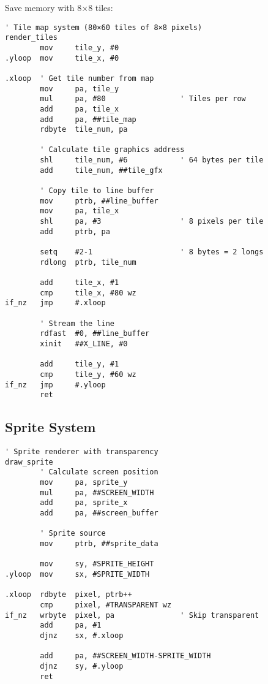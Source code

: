\documentclass[11pt]{book}
\begin{document}
Save memory with 8×8 tiles:

\begin{lstlisting}
' Tile map system (80×60 tiles of 8×8 pixels)
render_tiles
        mov     tile_y, #0
.yloop  mov     tile_x, #0
        
.xloop  ' Get tile number from map
        mov     pa, tile_y
        mul     pa, #80                 ' Tiles per row
        add     pa, tile_x
        add     pa, ##tile_map
        rdbyte  tile_num, pa
        
        ' Calculate tile graphics address
        shl     tile_num, #6            ' 64 bytes per tile
        add     tile_num, ##tile_gfx
        
        ' Copy tile to line buffer
        mov     ptrb, ##line_buffer
        mov     pa, tile_x
        shl     pa, #3                  ' 8 pixels per tile
        add     ptrb, pa
        
        setq    #2-1                    ' 8 bytes = 2 longs
        rdlong  ptrb, tile_num
        
        add     tile_x, #1
        cmp     tile_x, #80 wz
if_nz   jmp     #.xloop
        
        ' Stream the line
        rdfast  #0, ##line_buffer
        xinit   ##X_LINE, #0
        
        add     tile_y, #1
        cmp     tile_y, #60 wz
if_nz   jmp     #.yloop
        ret
\end{lstlisting}

\hypertarget{sprite-system}{%
\subsection{Sprite System}\label{sprite-system}}

\begin{lstlisting}
' Sprite renderer with transparency
draw_sprite
        ' Calculate screen position
        mov     pa, sprite_y
        mul     pa, ##SCREEN_WIDTH
        add     pa, sprite_x
        add     pa, ##screen_buffer
        
        ' Sprite source
        mov     ptrb, ##sprite_data
        
        mov     sy, #SPRITE_HEIGHT
.yloop  mov     sx, #SPRITE_WIDTH
        
.xloop  rdbyte  pixel, ptrb++
        cmp     pixel, #TRANSPARENT wz
if_nz   wrbyte  pixel, pa               ' Skip transparent
        add     pa, #1
        djnz    sx, #.xloop
        
        add     pa, ##SCREEN_WIDTH-SPRITE_WIDTH
        djnz    sy, #.yloop
        ret
\end{lstlisting}
\end{document}
